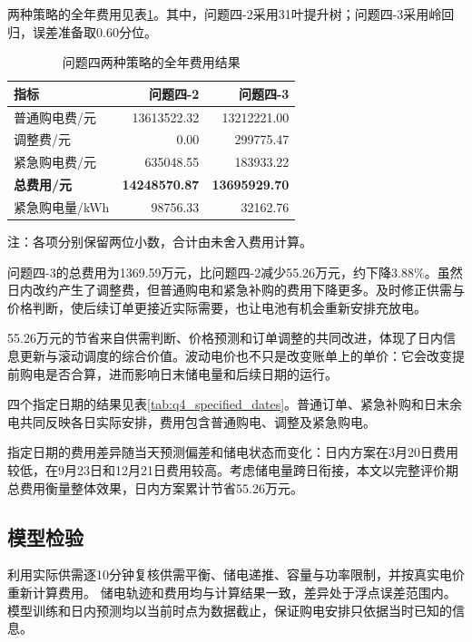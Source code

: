 两种策略的全年费用见表\ref{tab:q4_final_results}。其中，问题四-2采用31叶提升树；问题四-3采用岭回归，误差准备取0.60分位。

\begin{table}[H]
    \centering
    \caption{问题四两种策略的全年费用结果}
    \label{tab:q4_final_results}
    \begin{tabular}{lrr}
        \hline
        指标 & 问题四-2 & 问题四-3 \\
        \hline
        普通购电费/元 & 13613522.32 & 13212221.00 \\
        调整费/元 & 0.00 & 299775.47 \\
        紧急购电费/元 & 635048.55 & 183933.22 \\
        \textbf{总费用/元} & \textbf{14248570.87} & \textbf{13695929.70} \\
        紧急购电量/kWh & 98756.33 & 32162.76 \\
        \hline
    \end{tabular}
\par\smallskip
{\small 注：各项分别保留两位小数，合计由未舍入费用计算。}
\end{table}

问题四-3的总费用为1369.59万元，比问题四-2减少55.26万元，约下降3.88\%。虽然日内改约产生了调整费，但普通购电和紧急补购的费用下降更多。及时修正供需与价格判断，使后续订单更接近实际需要，也让电池有机会重新安排充放电。

55.26万元的节省来自供需判断、价格预测和订单调整的共同改进，体现了日内信息更新与滚动调度的综合价值。波动电价也不只是改变账单上的单价：它会改变提前购电是否合算，进而影响日末储电量和后续日期的运行。

四个指定日期的结果见表\ref{tab:q4_specified_dates}。普通订单、紧急补购和日末余电共同反映各日实际安排，费用包含普通购电、调整及紧急购电。

指定日期的费用差异随当天预测偏差和储电状态而变化：日内方案在3月20日费用较低，在9月23日和12月21日费用较高。考虑储电量跨日衔接，本文以完整评价期总费用衡量整体效果，日内方案累计节省55.26万元。

\subsection{模型检验}

利用实际供需逐10分钟复核供需平衡、储电递推、容量与功率限制，并按真实电价重新计算费用。
储电轨迹和费用均与计算结果一致，差异处于浮点误差范围内。
模型训练和日内预测均以当前时点为数据截止，保证购电安排只依据当时已知的信息。

